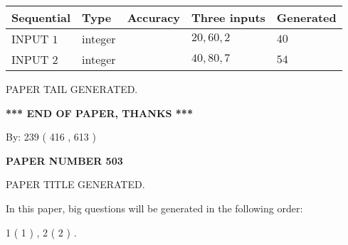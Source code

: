 \documentclass{ctexart}
\begin{document}
   
  
  
\noindent\begin{tabular}{|l|l|l|l|l|}
\hline
 Sequential & Type & Accuracy & Three inputs & Generated \\ 
\hline
 
 
  INPUT $  1 $ & integer &  & $
 20
 , 
 60
 , 
 2
 $ & $ 40 $ 
 \\  \hline  
 
 
  INPUT $  2 $ & integer &  & $
 40
 , 
 80
 , 
 7
 $ & $ 54 $ 
 \\  \hline  
 \end{tabular}
   
   
   
   
   
   
 \vspace{0.2in}
 
   
   
\vspace{2.0in} PAPER TAIL GENERATED.
   
   
   
   
\vspace{1.0in} 
{\textbf{\large{ *** END OF PAPER, THANKS *** }}} 
   
   
\hspace{1.0in} By: 
 239 ( 416 ,  613 )
   
   
   
   
\newpage 
\setcounter{page}{ 
   503001 } 
   
   
   
   
 {\textbf{ \Large{ PAPER NUMBER  503  }}}
   
   
\vspace{0.2in}
   
   
   
   
   
   
   
   
 \vspace{0.2in}
 
 
 
 
   
   
 PAPER TITLE GENERATED.
   
   
   
\vspace{0.2in}
   
In this paper, big questions will be generated in the following order: 
   
   
   1 ( 1 )
 ,
   2 ( 2 )
 .
  
\end{document}
